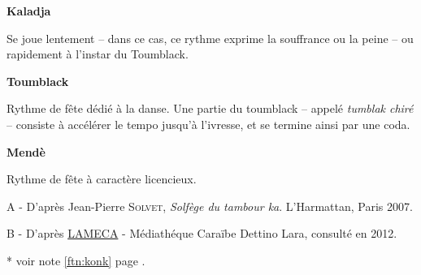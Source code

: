 \bigskip
\bigskip

{\large \textbf{Kaladja}}

Se joue lentement -- dans ce cas, ce rythme exprime la souffrance ou la peine -- ou rapidement à l'instar du Toumblack.
\bigskip
\begin{quote}
{%
\parindent 0pt
\noindent
\ifx\preLilyPondExample \undefined
\else
  \expandafter\preLilyPondExample
\fi
\def\lilypondbook{}%

\ifx\postLilyPondExample \undefined
\else
  \expandafter\postLilyPondExample
\fi
}
\end{quote}

\bigskip
\bigskip
{\large \textbf{Toumblack}}

Rythme de fête dédié à la danse. Une partie du toumblack -- appelé \textit{tumblak chiré} -- consiste à accélérer le tempo jusqu'à l'ivresse, et se termine ainsi par une coda.
\bigskip
\begin{quote}
{%
\parindent 0pt
\noindent
\ifx\preLilyPondExample \undefined
\else
  \expandafter\preLilyPondExample
\fi
\def\lilypondbook{}%

\ifx\postLilyPondExample \undefined
\else
  \expandafter\postLilyPondExample
\fi
}
\end{quote}



\bigskip
\bigskip
{\large \textbf{Mendè}}

Rythme de fête à caractère licencieux.
\bigskip
\begin{quote}
{%
\parindent 0pt
\noindent
\ifx\preLilyPondExample \undefined
\else
  \expandafter\preLilyPondExample
\fi
\def\lilypondbook{}%

\ifx\postLilyPondExample \undefined
\else
  \expandafter\postLilyPondExample
\fi
}
\end{quote}


\bigskip
\bigskip
\par 
A - D'après Jean-Pierre \textsc{Solvet}, \textit{Solfège du tambour ka}. L'Harmattan, Paris 2007. 
\par
B - D'après \href{http://www.lameca.org}{LAMECA} - Médiathéque Caraïbe Dettino Lara, consulté en 2012. \\
\par
* voir note \ref{ftn:konk} page \pageref{ftn:konk}.
